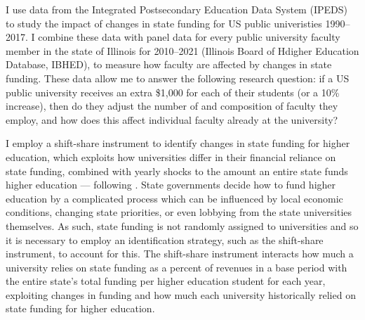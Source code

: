 I use data from the Integrated Postsecondary Education Data System (IPEDS) to study the impact of changes in state funding for US public univeristies 1990--2017.
I combine these data with panel data for every public university faculty member in the state of Illinois for 2010--2021 (Illinois Board of Hdigher Education Database, IBHED), to measure how faculty are affected by changes in state funding.
These data allow me to answer the following research question: if a US public university receives an extra \$1,000 for each of their students (or a 10\% increase), then do they adjust the number of and composition of faculty they employ, and how does this affect individual faculty already at the university?

I employ a shift-share instrument to identify changes in state funding for higher education, which exploits how universities differ in their financial reliance on state funding, combined with yearly shocks to the amount an entire state funds higher education --- following \cite{NBERw23736,NBERw27885}.
State governments decide how to fund higher education by a complicated process which can be influenced by local economic conditions, changing state priorities, or even lobbying from the state universities themselves.
As such, state funding is not randomly assigned to universities and so it is necessary to employ an identification strategy, such as the shift-share instrument, to account for this.
The shift-share instrument interacts how much a university relies on state funding as a percent of revenues in a base period with the entire state's total funding per higher education student for each year, exploiting changes in funding and how much each university historically relied on state funding for higher education.

